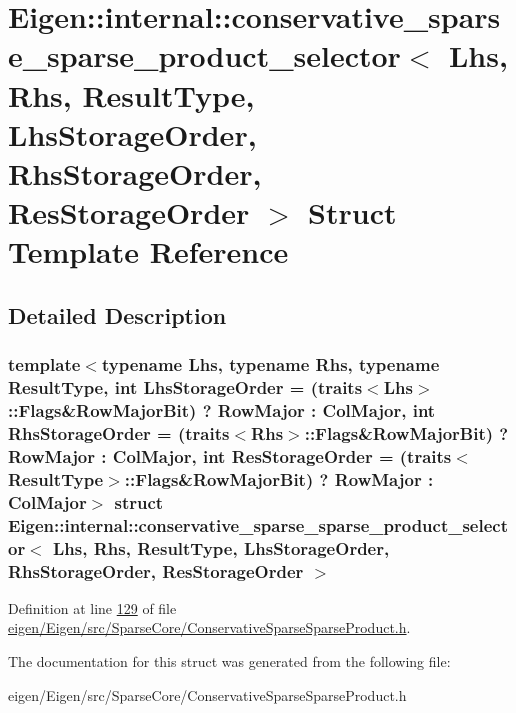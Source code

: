 \hypertarget{struct_eigen_1_1internal_1_1conservative__sparse__sparse__product__selector}{}\section{Eigen\+:\+:internal\+:\+:conservative\+\_\+sparse\+\_\+sparse\+\_\+product\+\_\+selector$<$ Lhs, Rhs, Result\+Type, Lhs\+Storage\+Order, Rhs\+Storage\+Order, Res\+Storage\+Order $>$ Struct Template Reference}
\label{struct_eigen_1_1internal_1_1conservative__sparse__sparse__product__selector}


\subsection{Detailed Description}
\subsubsection*{template$<$typename Lhs, typename Rhs, typename Result\+Type, int Lhs\+Storage\+Order = (traits$<$\+Lhs$>$\+::\+Flags\&\+Row\+Major\+Bit) ? Row\+Major \+: Col\+Major, int Rhs\+Storage\+Order = (traits$<$\+Rhs$>$\+::\+Flags\&\+Row\+Major\+Bit) ? Row\+Major \+: Col\+Major, int Res\+Storage\+Order = (traits$<$\+Result\+Type$>$\+::\+Flags\&\+Row\+Major\+Bit) ? Row\+Major \+: Col\+Major$>$\newline
struct Eigen\+::internal\+::conservative\+\_\+sparse\+\_\+sparse\+\_\+product\+\_\+selector$<$ Lhs, Rhs, Result\+Type, Lhs\+Storage\+Order, Rhs\+Storage\+Order, Res\+Storage\+Order $>$}



Definition at line \hyperlink{eigen_2_eigen_2src_2_sparse_core_2_conservative_sparse_sparse_product_8h_source_l00129}{129} of file \hyperlink{eigen_2_eigen_2src_2_sparse_core_2_conservative_sparse_sparse_product_8h_source}{eigen/\+Eigen/src/\+Sparse\+Core/\+Conservative\+Sparse\+Sparse\+Product.\+h}.



The documentation for this struct was generated from the following file\+:\begin{DoxyCompactItemize}
\item 
eigen/\+Eigen/src/\+Sparse\+Core/\+Conservative\+Sparse\+Sparse\+Product.\+h\end{DoxyCompactItemize}
